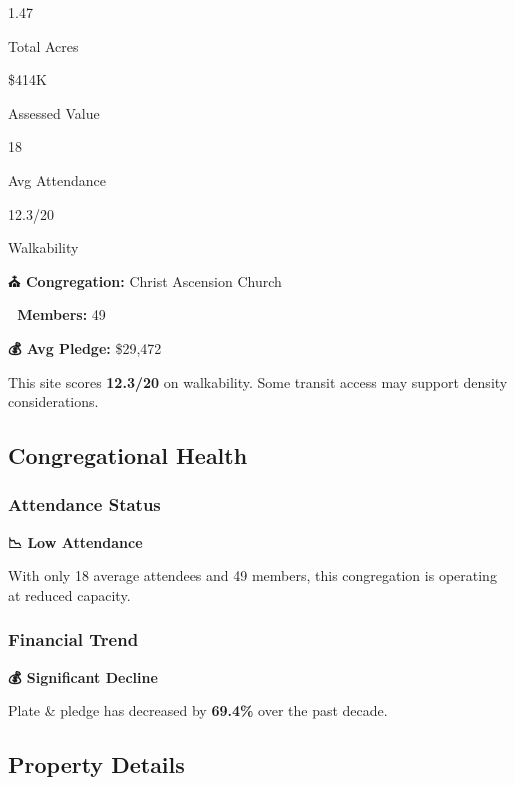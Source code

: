 \documentclass[
  letterpaper,
  DIV=11,
  numbers=noendperiod,
  oneside]{scrreprt}
\begin{document}
{1.47}

{Total Acres}

{\$414K}

{Assessed Value}

{18}

{Avg Attendance}

{12.3/20}

{Walkability}

\textbf{⛪ Congregation:} Christ Ascension Church

\textbf{👥 Members:} 49

\textbf{💰 Avg Pledge:} \$29,472

\begin{tcolorbox}[enhanced jigsaw, bottomtitle=1mm, left=2mm, rightrule=.15mm, colbacktitle=quarto-callout-note-color!10!white, arc=.35mm, title=\textcolor{quarto-callout-note-color}{\faInfo}\hspace{0.5em}{🚶 Moderate Walkability}, bottomrule=.15mm, colback=white, colframe=quarto-callout-note-color-frame, leftrule=.75mm, titlerule=0mm, opacitybacktitle=0.6, breakable, coltitle=black, toptitle=1mm, toprule=.15mm, opacityback=0]

This site scores \textbf{12.3/20} on walkability. Some transit access
may support density considerations.

\end{tcolorbox}

\subsection{Congregational Health}

\subsubsection{Attendance Status}\label{attendance-status-3}

\textbf{📉 Low Attendance}

With only 18 average attendees and 49 members, this congregation is
operating at reduced capacity.

\subsubsection{Financial Trend}\label{financial-trend-3}

\textbf{💰 Significant Decline}

Plate \& pledge has decreased by \textbf{69.4\%} over the past decade.

\subsection{Property Details}
\end{document}
